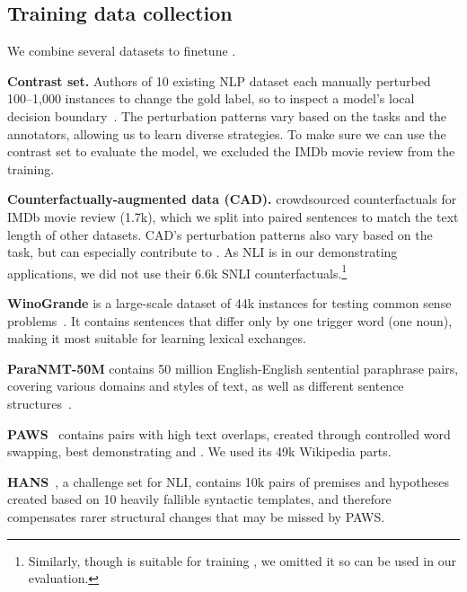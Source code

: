 \subsection{Training data collection}


We combine several datasets to finetune \sysname.

\textbf{Contrast set.}
Authors of 10 existing NLP dataset each manually perturbed 100--1,000 instances to change the gold label, so to inspect a model's local decision boundary~\cite{gardner2020contrast}.
The perturbation patterns vary based on the tasks and the annotators, allowing us to learn diverse strategies.
To make sure we can use the contrast set to evaluate the \sst model, we excluded the IMDb movie review from the training.


\textbf{Counterfactually-augmented data (CAD).}
\citet{kaushik2019learning} crowdsourced counterfactuals for IMDb movie review (1.7k), which we split into paired sentences to match the text length of other datasets.
CAD's perturbation patterns also vary based on the task, but can especially contribute to .
As NLI is in our demonstrating applications, we did not use their 6.6k SNLI counterfactuals.\footnote{Similarly, though \qqp is suitable for training \sysname, we omitted it so \qqp can be used in our evaluation.}


\textbf{WinoGrande} is a large-scale dataset of 44k instances for testing common sense problems~\cite{sakaguchi2019winogrande}.
It contains sentences that differ only by one trigger word (\eg one noun), making it most suitable for learning lexical exchanges.

\textbf{ParaNMT-50M} contains 50 million English-English sentential paraphrase pairs, covering various domains and styles of text, as well as different sentence structures~\cite{wieting2017paranmt}. 

\textbf{PAWS}~\cite{zhang2019paws} contains pairs with high text overlaps, created through controlled word swapping, best demonstrating  and . We used its 49k Wikipedia parts.


\textbf{HANS}~\cite{mccoy2019right}, a challenge set for NLI, contains 10k pairs of premises and hypotheses created based on 10 heavily fallible syntactic templates, and therefore compensates rarer structural changes that may be missed by PAWS.


